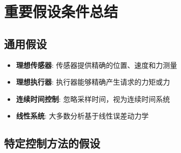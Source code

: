 \documentclass[12pt,a4paper]{article}
\begin{document}
\section{重要假设条件总结}

\subsection{通用假设}

\begin{itemize}
\item \textbf{理想传感器}: 传感器提供精确的位置、速度和力测量
\item \textbf{理想执行器}: 执行器能够精确产生请求的力矩或力
\item \textbf{连续时间控制}: 忽略采样时间，视为连续时间系统
\item \textbf{线性系统}: 大多数分析基于线性误差动力学
\end{itemize}

\subsection{特定控制方法的假设}
\end{document}

